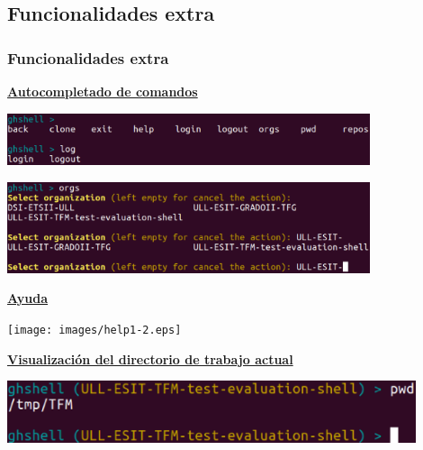 \documentclass{beamer}
\begin{document}
\subsection{Funcionalidades extra}
  
\begin{frame}[allowframebreaks]
\frametitle{Funcionalidades extra}
  
  \underline{{\bfseries Autocompletado de comandos}}
  \bigskip
  
  \begin{center}
  	\includegraphics[width=0.8\textwidth]{images/tab1-1.eps}
  \end{center}
  \begin{center}
  	\includegraphics[width=0.8\textwidth]{images/tab1-2.eps}
  \end{center}
  
  \framebreak
  
  \underline{{\bfseries Ayuda}}
  \bigskip
  
  \begin{center}
  	\texttt{[image: images/help1-2.eps]}
  \end{center}
  
  \framebreak
  
  \underline{{\bfseries Visualización del directorio de trabajo actual}}
  \bigskip
  \bigskip
    
  \begin{center}
  	\includegraphics[width=0.9\textwidth]{images/pwd.eps}
  \end{center}
  
  \framebreak
  

\end{frame}
\end{document}
